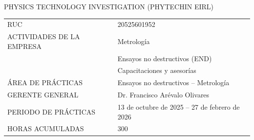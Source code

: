 \newpage
{\centering
{\Large PHYSICS TECHNOLOGY INVESTIGATION (PHYTECHIN EIRL)}\\[1.5cm]

\begin{tabular}{ll}
RUC                       & 20525601952\\[6pt]
ACTIVIDADES DE LA EMPRESA & Metrología\\
                          & Ensayos no destructivos (END)\\
                          & Capacitaciones y asesorías\\[6pt]
ÁREA DE PRÁCTICAS         & Ensayos no destructivos -- Metrología\\[6pt]
GERENTE GENERAL           & Dr. Francisco Arévalo Olivares\\[6pt]
PERIODO DE PRÁCTICAS      & 13 de octubre de 2025 -- 27 de febrero de 2026\\[6pt]
HORAS ACUMULADAS          & 300
\end{tabular}
\par}

\newpage
\tableofcontents
\newpage
